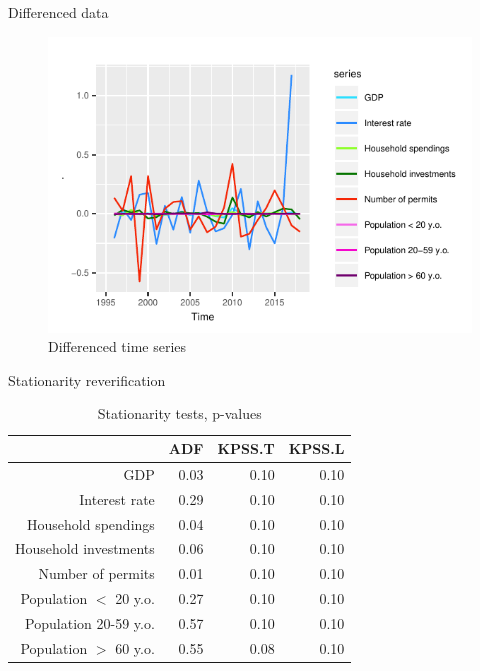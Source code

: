 \documentclass[11pt,ignorenonframetext,]{beamer}
\begin{document}
\begin{frame}{Differenced data}
\protect\hypertarget{differenced-data}{}

\FloatBarrier

\tiny

\begin{figure}[!htbp]

{\centering \includegraphics{presentation_files/figure-beamer/unnamed-chunk-21-1} 

}

\caption{Differenced time series}\label{fig:unnamed-chunk-21}
\end{figure}

\normalsize

\FloatBarrier

\end{frame}

\begin{frame}{Stationarity reverification}
\protect\hypertarget{stationarity-reverification}{}

\FloatBarrier

\tiny

\begin{table}[ht]
\centering
\begin{tabular}{rrrr}
  \hline
 & ADF & KPSS.T & KPSS.L \\ 
  \hline
GDP & 0.03 & 0.10 & 0.10 \\ 
  Interest rate & 0.29 & 0.10 & 0.10 \\ 
  Household spendings & 0.04 & 0.10 & 0.10 \\ 
  Household investments & 0.06 & 0.10 & 0.10 \\ 
  Number of permits & 0.01 & 0.10 & 0.10 \\ 
  Population $<$ 20 y.o. & 0.27 & 0.10 & 0.10 \\ 
  Population 20-59 y.o. & 0.57 & 0.10 & 0.10 \\ 
  Population $>$ 60 y.o. & 0.55 & 0.08 & 0.10 \\ 
   \hline
\end{tabular}
\caption{Stationarity tests, p-values} 
\end{table}

\normalsize

\FloatBarrier

\end{frame}
\end{document}
